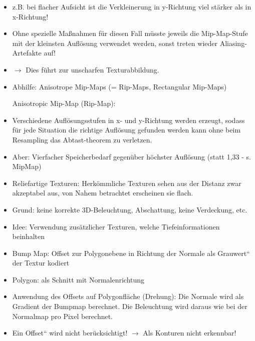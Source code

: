 \documentclass[10pt,landscape]{article}
\makeatletter
\renewcommand{\subsection}{\@startsection{subsection}{2}{0mm}%
                                {-1explus -.5ex minus -.2ex}%
                                {0.5ex plus .2ex}%
                                {\normalfont\normalsize\bfseries}}
\makeatother
\begin{document}
\begin{multicols}{3}
{\begin{itemize}
  
  Anisotrope Filterung: 
  \item z.B. bei flacher Aufsicht ist die Verkleinerung in y-Richtung viel stärker als in x-Richtung!
  \item Ohne spezielle Maßnahmen für diesen Fall müsste jeweils die Mip-Map-Stufe mit der kleinsten Auflösung verwendet werden, sonst treten wieder Aliasing-Artefakte auf! 
  \item $\rightarrow$ Dies führt zur unscharfen Texturabbildung.
  \item Abhilfe: Anisotrope Mip-Maps (= Rip-Maps, Rectangular Mip-Maps)
  
  Anisotropic Mip-Map (Rip-Map):
  \item Verschiedene Auflösungsstufen in x- und y-Richtung werden erzeugt, sodass für jede Situation die richtige Auflösung gefunden werden kann ohne beim Resampling das Abtast-theorem zu verletzen.
  \item Aber: Vierfacher Speicherbedarf gegenüber höchster Auflösung (statt 1,33 - s. MipMap)
  
  
  \item Reliefartige Texturen: Herkömmliche Texturen sehen aus der Distanz zwar akzeptabel aus, von Nahem betrachtet erscheinen sie flach.
  \item Grund: keine korrekte 3D-Beleuchtung, Abschattung, keine Verdeckung, etc.
  \item Idee: Verwendung zusätzlicher Texturen, welche Tiefeinformationen beinhalten
  
  \item Bump Map: Offset zur Polygonebene in Richtung der Normale als Grauwert“ der Textur kodiert
  \item Polygon: als Schnitt mit Normalenrichtung
  \item Anwendung des Offsets auf Polygonfläche (Drehung): Die Normale wird als Gradient der Bumpmap berechnet. Die Beleuchtung wird daraus wie bei der Normalmap pro Pixel berechnet.
  \item Ein Offset“ wird nicht berücksichtigt! $\rightarrow$ Als Konturen nicht erkennbar!
  

\end{itemize}}
\end{multicols}
\end{document}
